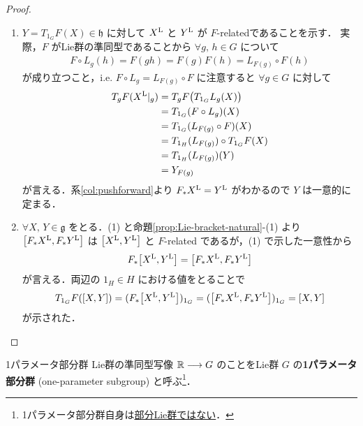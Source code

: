 \documentclass[TQFT_main]{subfiles}
\begin{document}
\begin{proof}
    \begin{enumerate}
        \item $Y = T_{1_G} F(X) \in \mathfrak{h}$ に対して $X^{\mathrm{L}}$ と $Y^{\mathrm{L}}$ が $F$-relatedであることを示す．
        実際，$F$ がLie群の準同型であることから
        $\forall g,\, h \in G$ について
        \begin{align}
            F \circ L_g (h) = F(gh) = F(g)F(h) = L_{F(g)} \circ F(h)
        \end{align}
        が成り立つこと，i.e. $F \circ L_g = L_{F(g)} \circ F$ に注意すると
        $\forall g \in G$ に対して
        \begin{align}
            T_g F (X^{\mathrm{L}}|_g) &= T_g F \bigl( T_{1_G} L_g(X) \bigr) \\
            &= T_{1_G}(F \circ L_g)(X) \\
            &= T_{1_G}(L_{F(g)} \circ F)(X) \\
            &= T_{1_H}(L_{F(g)}) \circ T_{1_G} F(X) \\
            &= T_{1_H}(L_{F(g)})(Y) \\
            &= Y_{F(g)}
        \end{align}
        が言える．系\ref{col:pushforward}より $F_* X^{\mathrm{L}} = Y^{\mathrm{L}}$ がわかるので $Y$ は一意的に定まる．
        \item $\forall X,\, Y \in \mathfrak{g}$ をとる．(1) と命題\ref{prop:Lie-bracket-natural}-(1) より $\comm{F_* \Lie{X}}{F_* \Lie{Y}}$ は $\comm{\Lie{X}}{\Lie{Y}}$ と $F$-related であるが，(1) で示した一意性から
        \begin{align}
            F_*\comm{\Lie{X}}{\Lie{Y}} = \comm{F_* \Lie{X}}{F_* \Lie{Y}}
        \end{align}
        が言える．両辺の $1_H \in H$ における値をとることで
        \begin{align}
            T_{1_G}F (\comm{X}{Y}) = (F_*\comm{\Lie{X}}{\Lie{Y}})_{1_G} = (\comm{F_* \Lie{X}}{F_* \Lie{Y}})_{1_G} = \comm{X}{Y}
        \end{align}
        が示された．
    \end{enumerate}
\end{proof}


\begin{mydef}[label=def:one-parameter-subgroup]{1パラメータ部分群}
    Lie群の準同型写像 $\mathbb{R} \longrightarrow G$ のことをLie群 $G$ の\textbf{1パラメータ部分群} (one-parameter subgroup) と呼ぶ\footnote{1パラメータ部分群自身は\underline{部分Lie群ではない}．}．
\end{mydef}
\end{document}
